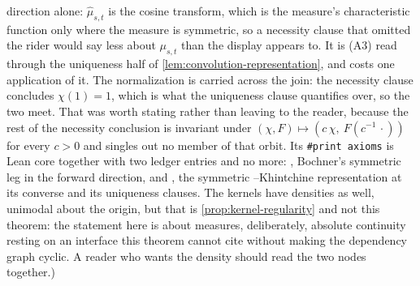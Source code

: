 \begin{theorem}
{direction alone: $\hat\mu_{s,t}$ is the cosine transform, which is the measure's characteristic
function only where the measure is symmetric, so a necessity clause that omitted the rider would
say less about $\mu_{s,t}$ than the display appears to. It is (A3) read through the uniqueness
half of \ref{lem:convolution-representation}, and costs one application of it. The
normalization is carried across the join: the necessity clause concludes $\chi(1) = 1$, which
is what the uniqueness clause quantifies over, so the two meet. That was worth stating rather
than leaving to the reader, because the rest of the necessity conclusion is invariant under
$(\chi,F) \mapsto (c\,\chi,\ F(c^{-1}\,\cdot))$ for every $c > 0$ and singles out no member of
that orbit. Its
\texttt{\#print axioms} is Lean core together with two ledger entries and no more:
, Bochner's symmetric leg in the forward direction, and , the symmetric
\Levy--Khintchine representation at its converse and its uniqueness clauses. The kernels
have densities as well, unimodal about the origin, but that is \ref{prop:kernel-regularity} and
not this theorem: the statement here is about measures, deliberately, absolute continuity
resting on an interface this theorem cannot cite without making the dependency graph cyclic.
A reader who wants the density should read the two nodes together.)}
\end{theorem}

